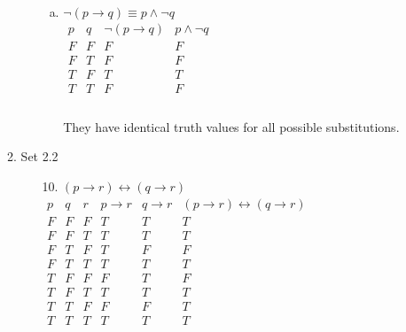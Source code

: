 \documentclass[letterpaper]{article}
\begin{document}
\begin{enumerate}
\begin{enumerate}
\begin{itemize}
\begin{enumerate}[(a)]
					\item
					$\neg \left( p \rightarrow q \right) \equiv p \wedge \neg q$ \\ $\begin{array}{c|c|c|c}
						p & q & \neg \left( p \rightarrow q \right) & p \wedge \neg q \\ \hline
						F & F & F & F \\ \hline
						F & T & F & F \\ \hline
						T & F & T & T \\ \hline
						T & T & F & F \\
					\end{array}$ \\
					\\
					They have identical truth values for all possible substitutions.
				\end{enumerate}				
			\end{itemize}
		
			\item Set 2.2
			\begin{itemize}
				\item [10.]
				$\left( p \rightarrow r \right) \leftrightarrow \left( q \rightarrow r \right)$ \\
				$\begin{array}{c|c|c|c|c|c}
					p & q & r & p \rightarrow r & q \rightarrow r & \left( p \rightarrow r \right) \leftrightarrow \left( q \rightarrow r \right) \\ \hline
					F & F & F & T & T & T \\ \hline
					F & F & T & T & T & T \\ \hline
					F & T & F & T & F & F \\ \hline
					F & T & T & T & T & T \\ \hline
					T & F & F & F & T & F \\ \hline
					T & F & T & T & T & T \\ \hline
					T & T & F & F & F & T \\ \hline
					T & T & T & T & T & T \\ 
				\end{array}$
				

\end{itemize}
\end{enumerate}
\end{enumerate}
\end{document}
